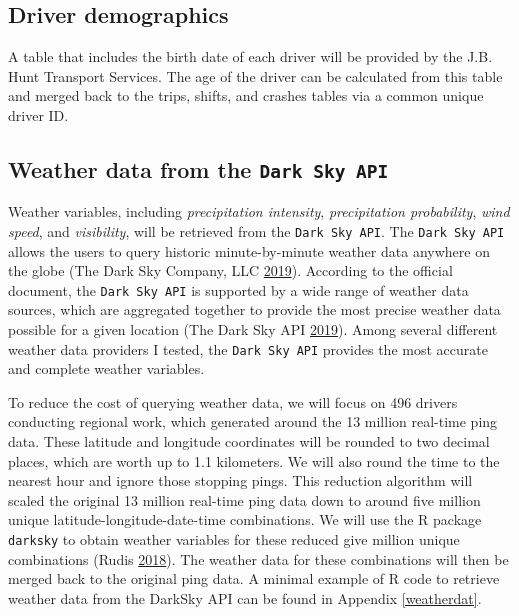 \documentclass[12pt]{book}
\numberwithin{equation}{chapter}
\begin{document}
\hypertarget{driver-demographics}{%
\subsection{Driver demographics}\label{driver-demographics}}

A table that includes the birth date of each driver will be provided by the J.B. Hunt Transport Services. The age of the driver can be calculated from this table and merged back to the trips, shifts, and crashes tables via a common unique driver ID.

\hypertarget{weather-data-from-the-dark-sky-api}{%
\subsection{\texorpdfstring{Weather data from the \texttt{Dark\ Sky\ API}}{Weather data from the Dark Sky API}}\label{weather-data-from-the-dark-sky-api}}

Weather variables, including \emph{precipitation intensity}, \emph{precipitation probability}, \emph{wind speed}, and \emph{visibility}, will be retrieved from the \texttt{Dark\ Sky\ API}.
The \texttt{Dark\ Sky\ API} allows the users to query historic minute-by-minute weather data anywhere on the globe (The Dark Sky Company, LLC \protect\hyperlink{ref-darksky}{2019}).
According to the official document, the \texttt{Dark\ Sky\ API} is supported by a wide range of weather data sources, which are aggregated together to provide the most precise weather data possible for a given location (The Dark Sky API \protect\hyperlink{ref-darkskyds}{2019}).
Among several different weather data providers I tested, the \texttt{Dark\ Sky\ API} provides the most accurate and complete weather variables.

To reduce the cost of querying weather data, we will focus on 496 drivers conducting regional work, which generated around the 13 million real-time ping data. These latitude and longitude coordinates will be rounded to two decimal places, which are worth up to 1.1 kilometers.
We will also round the time to the nearest hour and ignore those stopping pings.
This reduction algorithm will scaled the original 13 million real-time ping data down to around five million unique latitude-longitude-date-time combinations.
We will use the R package \texttt{darksky} to obtain weather variables for these reduced give million unique combinations (Rudis \protect\hyperlink{ref-hrbrmstr}{2018}).
The weather data for these combinations will then be merged back to the original ping data.
A minimal example of R code to retrieve weather data from the DarkSky API can be found in Appendix \ref{weatherdat}.
\end{document}
